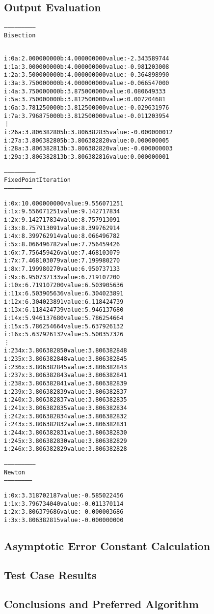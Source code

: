 \documentclass[11pt]{article} %
\begin{document}
\subsection*{Output Evaluation}
\begin{alltt}
--------------------------
 Bisection
 -----------------------


i: 0	a: 2.000000000	b: 4.000000000	value: -2.343589744 
i: 1	a: 3.000000000	b: 4.000000000	value: -0.981203008 
i: 2	a: 3.500000000	b: 4.000000000	value: -0.364898990 
i: 3	a: 3.750000000	b: 4.000000000	value: -0.066547000 
i: 4	a: 3.750000000	b: 3.875000000	value: 0.080649333 
i: 5	a: 3.750000000	b: 3.812500000	value: 0.007204681 
i: 6	a: 3.781250000	b: 3.812500000	value: -0.029631976 
i: 7	a: 3.796875000	b: 3.812500000	value: -0.011203954 
\vdots
i: 26	a: 3.806382805	b: 3.806382835	value: -0.000000012 
i: 27	a: 3.806382805	b: 3.806382820	value: 0.000000005 
i: 28	a: 3.806382813	b: 3.806382820	value: -0.000000003 
i: 29	a: 3.806382813	b: 3.806382816	value: 0.000000001 

--------------------------
 Fixed Point Iteration
 -----------------------


i: 0	x: 10.000000000	value: 9.556071251
i: 1	x: 9.556071251	value: 9.142717834
i: 2	x: 9.142717834	value: 8.757913091
i: 3	x: 8.757913091	value: 8.399762914
i: 4	x: 8.399762914	value: 8.066496782
i: 5	x: 8.066496782	value: 7.756459426
i: 6	x: 7.756459426	value: 7.468103079
i: 7	x: 7.468103079	value: 7.199980270
i: 8	x: 7.199980270	value: 6.950737133
i: 9	x: 6.950737133	value: 6.719107200
i: 10	x: 6.719107200	value: 6.503905636
i: 11	x: 6.503905636	value: 6.304023891
i: 12	x: 6.304023891	value: 6.118424739
i: 13	x: 6.118424739	value: 5.946137680
i: 14	x: 5.946137680	value: 5.786254664
i: 15	x: 5.786254664	value: 5.637926132
i: 16	x: 5.637926132	value: 5.500357326
\vdots
i: 234	x: 3.806382850	value: 3.806382848
i: 235	x: 3.806382848	value: 3.806382845
i: 236	x: 3.806382845	value: 3.806382843
i: 237	x: 3.806382843	value: 3.806382841
i: 238	x: 3.806382841	value: 3.806382839
i: 239	x: 3.806382839	value: 3.806382837
i: 240	x: 3.806382837	value: 3.806382835
i: 241	x: 3.806382835	value: 3.806382834
i: 242	x: 3.806382834	value: 3.806382832
i: 243	x: 3.806382832	value: 3.806382831
i: 244	x: 3.806382831	value: 3.806382830
i: 245	x: 3.806382830	value: 3.806382829
i: 246	x: 3.806382829	value: 3.806382828



--------------------------
 Newton
 -----------------------


i: 0	x: 3.318702187	value: -0.585022456
i: 1	x: 3.796734040	value: -0.011370114
i: 2	x: 3.806379686	value: -0.000003686
i: 3	x: 3.806382815	value: -0.000000000

\end{alltt}
\subsection*{Asymptotic Error Constant Calculation}

\subsection*{Test Case Results}

\subsection*{Conclusions and Preferred Algorithm}
 
\end{document}
